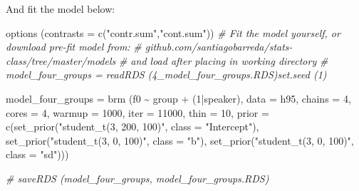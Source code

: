 \documentclass[
]{book}
\newenvironment{Shaded}{\begin{snugshade}}{\end{snugshade}}
\newcommand{\AttributeTok}[1]{\textcolor[rgb]{0.77,0.63,0.00}{#1}}
\newcommand{\CommentTok}[1]{\textcolor[rgb]{0.56,0.35,0.01}{\textit{#1}}}
\newcommand{\DecValTok}[1]{\textcolor[rgb]{0.00,0.00,0.81}{#1}}
\newcommand{\FunctionTok}[1]{\textcolor[rgb]{0.00,0.00,0.00}{#1}}
\newcommand{\NormalTok}[1]{#1}
\newcommand{\OtherTok}[1]{\textcolor[rgb]{0.56,0.35,0.01}{#1}}
\newcommand{\SpecialCharTok}[1]{\textcolor[rgb]{0.00,0.00,0.00}{#1}}
\newcommand{\StringTok}[1]{\textcolor[rgb]{0.31,0.60,0.02}{#1}}
\begin{document}
And fit the model below:

\begin{Shaded}
\begin{Highlighting}[]
\FunctionTok{options}\NormalTok{ (}\AttributeTok{contrasts =} \FunctionTok{c}\NormalTok{(}\StringTok{"contr.sum"}\NormalTok{,}\StringTok{"cont.sum"}\NormalTok{))}
\CommentTok{\# Fit the model yourself, or download pre{-}fit model from: }
\CommentTok{\# github.com/santiagobarreda/stats{-}class/tree/master/models}
\CommentTok{\# and load after placing in working directory}
\CommentTok{\#  model\_four\_groups = readRDS (\textquotesingle{}4\_model\_four\_groups.RDS\textquotesingle{})set.seed (1)}

\NormalTok{model\_four\_groups }\OtherTok{=}  
  \FunctionTok{brm}\NormalTok{ (f0 }\SpecialCharTok{\textasciitilde{}}\NormalTok{ group }\SpecialCharTok{+}\NormalTok{ (}\DecValTok{1}\SpecialCharTok{|}\NormalTok{speaker), }\AttributeTok{data =}\NormalTok{ h95, }\AttributeTok{chains =} \DecValTok{4}\NormalTok{, }\AttributeTok{cores =} \DecValTok{4}\NormalTok{, }
       \AttributeTok{warmup =} \DecValTok{1000}\NormalTok{, }\AttributeTok{iter =} \DecValTok{11000}\NormalTok{, }\AttributeTok{thin =} \DecValTok{10}\NormalTok{, }
       \AttributeTok{prior =} \FunctionTok{c}\NormalTok{(}\FunctionTok{set\_prior}\NormalTok{(}\StringTok{"student\_t(3, 200, 100)"}\NormalTok{, }\AttributeTok{class =} \StringTok{"Intercept"}\NormalTok{),}
                              \FunctionTok{set\_prior}\NormalTok{(}\StringTok{"student\_t(3, 0, 100)"}\NormalTok{, }\AttributeTok{class =} \StringTok{"b"}\NormalTok{),}
                              \FunctionTok{set\_prior}\NormalTok{(}\StringTok{"student\_t(3, 0, 100)"}\NormalTok{, }\AttributeTok{class =} \StringTok{"sd"}\NormalTok{)))}

\CommentTok{\#  saveRDS (model\_four\_groups, \textquotesingle{}model\_four\_groups.RDS\textquotesingle{})}
\end{Highlighting}
\end{Shaded}
\end{document}

